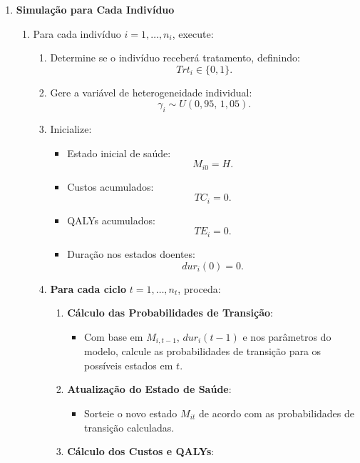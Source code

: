 \documentclass[12pt, a4paper, openany]{book}
\numberwithin{equation}{chapter}
\numberwithin{table}{chapter}
\numberwithin{figure}{chapter}
\theoremstyle{break}
\begin{document}
\begin{enumerate}
    \item \textbf{Simulação para Cada Indivíduo}
    \begin{enumerate}[label=\alph*)]
        \item Para cada indivíduo $i = 1, \dotsc, n_i$, execute:
        \begin{enumerate}[label=\roman*)]
            \item Determine se o indivíduo receberá tratamento, definindo:
            \[
            Trt_i \in \{0, 1\}.
            \]
            \item Gere a variável de heterogeneidade individual:
            \[
            \gamma_i \sim U(0{,}95,\, 1{,}05).
            \]
            \item Inicialize:
            \begin{itemize}
                \item Estado inicial de saúde:
                \[
                M_{i0} = H.
                \]
                \item Custos acumulados:
                \[
                TC_i = 0.
                \]
                \item QALYs acumulados:
                \[
                TE_i = 0.
                \]
                \item Duração nos estados doentes:
                \[
                dur_i(0) = 0.
                \]
            \end{itemize}
            \item \textbf{Para cada ciclo} $t = 1, \dotsc, n_t$, proceda:
            \begin{enumerate}[label=\alph*)]
                \item \textbf{Cálculo das Probabilidades de Transição}:
                \begin{itemize}
                    \item Com base em $M_{i,t-1}$, $dur_i(t-1)$ e nos parâmetros do modelo, calcule as probabilidades de transição para os possíveis estados em $t$.
                \end{itemize}
                \item \textbf{Atualização do Estado de Saúde}:
                \begin{itemize}
                    \item Sorteie o novo estado $M_{it}$ de acordo com as probabilidades de transição calculadas.
                \end{itemize}
                \item \textbf{Cálculo dos Custos e QALYs}:

\end{enumerate}
\end{enumerate}
\end{enumerate}
\end{enumerate}
\end{document}
